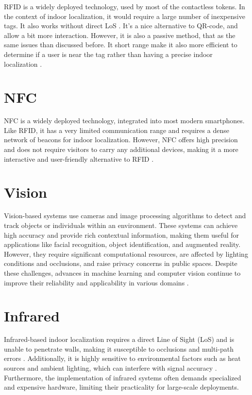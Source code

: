 RFID is a widely deployed technology, used by most of the contactless tokens. In the context of indoor localization, it would require a large number of inexpensive tags. It also works without direct LoS \cite{mainetti_survey_2014}. It's a nice alternative to QR-code, and allow a bit more interaction. However, it is also a passive method, that as the same issues than discussed before. It short range make it also more efficient to determine if a user is near the tag rather than having a precise indoor localization \cite{shang_overview_2022}. 

\section{NFC}

NFC is a widely deployed technology, integrated into most modern smartphones. Like RFID, it has a very limited communication range and requires a dense network of beacons for indoor localization. However, NFC offers high precision and does not require visitors to carry any additional devices, making it a more interactive and user-friendly alternative to RFID \cite{cai_museum_2015}. 

\section{Vision}

Vision-based systems use cameras and image processing algorithms to detect and track objects or individuals within an environment. These systems can achieve high accuracy and provide rich contextual information, making them useful for applications like facial recognition, object identification, and augmented reality. However, they require significant computational resources, are affected by lighting conditions and occlusions, and raise privacy concerns in public spaces. Despite these challenges, advances in machine learning and computer vision continue to improve their reliability and applicability in various domains \cite{mainetti_survey_2014}. 

\section{Infrared}

Infrared-based indoor localization requires a direct Line of Sight (LoS) and is unable to penetrate walls, making it susceptible to occlusions and multi-path errors \cite{mainetti_survey_2014}. Additionally, it is highly sensitive to environmental factors such as heat sources and ambient lighting, which can interfere with signal accuracy \cite{shang_overview_2022}. Furthermore, the implementation of infrared systems often demands specialized and expensive hardware, limiting their practicality for large-scale deployments.

